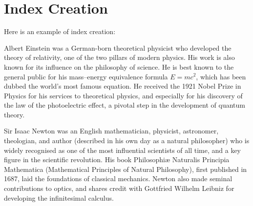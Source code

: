 \chapter{Index Creation}
Here is an example of index creation:

Albert Einstein was a German-born theoretical physicist who developed the theory of relativity, one of the two pillars of modern physics. His work is also known for its influence on the philosophy of science. He is best known to the general public for his mass–energy equivalence formula $E = mc^2$, which has been dubbed the world's most famous equation. He received the 1921 Nobel Prize in Physics for his services to theoretical physics, and especially for his discovery of the law of the photoelectric effect, a pivotal step in the development of quantum theory.


Sir Isaac Newton  was an English mathematician, physicist, astronomer, theologian, and author (described in his own day as a natural philosopher) who is widely recognised as one of the most influential scientists of all time, and a key figure in the scientific revolution. His book Philosophiæ Naturalis Principia Mathematica (Mathematical Principles of Natural Philosophy), first published in 1687, laid the foundations of classical mechanics. Newton also made seminal contributions to optics, and shares credit with Gottfried Wilhelm Leibniz for developing the infinitesimal calculus.
